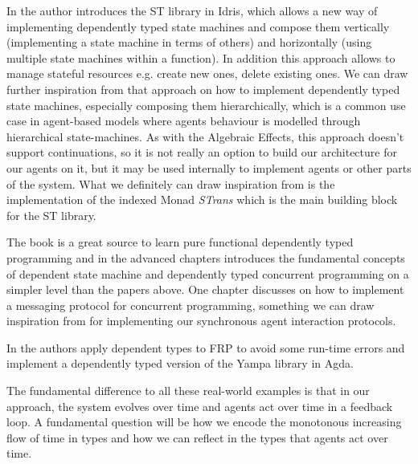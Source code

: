 In \cite{brady_state_2016} the author introduces the ST library in Idris, which allows a new way of implementing dependently typed state machines and compose them vertically (implementing a state machine in terms of others) and horizontally (using multiple state machines within a function). In addition this approach allows to manage stateful resources e.g. create new ones, delete existing ones. We can draw further inspiration from that approach on how to implement dependently typed state machines, especially composing them hierarchically, which is a common use case in agent-based models where agents behaviour is modelled through hierarchical state-machines. As with the Algebraic Effects, this approach doesn't support continuations, so it is not really an option to build our architecture for our agents on it, but it may be used internally to implement agents or other parts of the system. What we definitely can draw inspiration from is the implementation of the indexed Monad \textit{STrans} which is the main building block for the ST library.

The book \cite{brady_type-driven_2017} is a great source to learn pure functional dependently typed programming and in the advanced chapters introduces the fundamental concepts of dependent state machine and dependently typed concurrent programming on a simpler level than the papers above. One chapter discusses on how to implement a messaging protocol for concurrent programming, something we can draw inspiration from for implementing our synchronous agent interaction protocols.

In \cite{sculthorpe_safe_2009} the authors apply dependent types to FRP to avoid some run-time errors and implement a dependently typed version of the Yampa library in Agda.

The fundamental difference to all these real-world examples is that in our approach, the system evolves over time and agents act over time in a feedback loop. A fundamental question will be how we encode the monotonous increasing flow of time in types and how we can reflect in the types that agents act over time.



